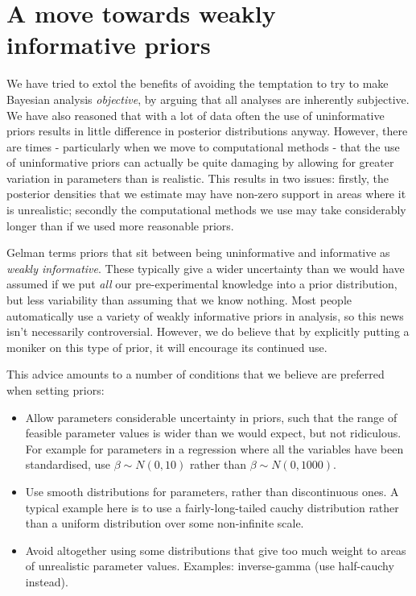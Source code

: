 \documentclass[11pt,fullpage]{book}
\begin{document}
\section{A move towards weakly informative priors}
We have tried to extol the benefits of avoiding the temptation to try to make Bayesian analysis \textit{objective}, by arguing that all analyses are inherently subjective. We have also reasoned that with a lot of data often the use of uninformative priors results in little difference in posterior distributions anyway. However, there are times - particularly when we move to computational methods - that the use of uninformative priors can actually be quite damaging by allowing for greater variation in parameters than is realistic. This results in two issues: firstly, the posterior densities that we estimate may have non-zero support in areas where it is unrealistic; secondly the computational methods we use may take considerably longer than if we used more reasonable priors. 

Gelman terms priors that sit between being uninformative and informative as \textit{weakly informative}. These typically give a wider uncertainty than we would have assumed if we put \textit{all} our pre-experimental knowledge into a prior distribution, but less variability than assuming that we know nothing. Most people automatically use a variety of weakly informative priors in analysis, so this news isn't necessarily controversial. However, we do believe that by explicitly putting a moniker on this type of prior, it will encourage its continued use. 

This advice amounts to a number of conditions that we believe are preferred when setting priors:

\begin{itemize}
\item Allow parameters considerable uncertainty in priors, such that the range of feasible parameter values is wider than we would expect, but not ridiculous. For example for parameters in a regression where all the variables have been standardised, use $\beta\sim N(0,10)$ rather than $\beta\sim N(0,1000)$.
\item Use smooth distributions for parameters, rather than discontinuous ones. A typical example here is to use a fairly-long-tailed cauchy distribution rather than a uniform distribution over some non-infinite scale.
\item Avoid altogether using some distributions that give too much weight to areas of unrealistic parameter values. Examples: inverse-gamma (use half-cauchy instead). 
\end{itemize}
\end{document}
